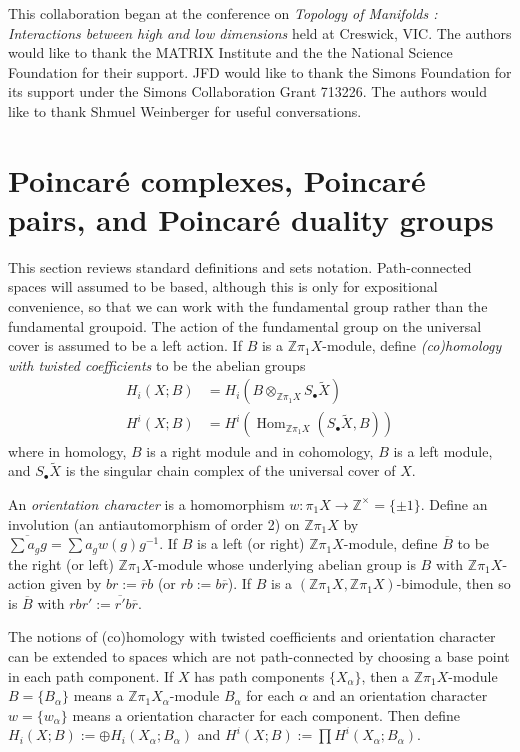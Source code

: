 \documentclass[12pt]{amsart}
\theoremstyle{definition}
\newcommand{\Z}{\mathbb Z}
\DeclareMathOperator{\Hom}{Hom}
\newcommand{\ol}[1]{{\overline{#1}}}
\newcommand{\wt}[1]{{\widetilde{#1}}}
\newcommand{\px}{\pi_1X}
\newcommand{\zpx}{\Z\pi_1X}
\begin{document}
\medskip
{}
This collaboration began at the conference on
 {\it Topology of Manifolds : Interactions between high and low dimensions\/} 
 held at Creswick, VIC.
The authors would like to thank the 
 MATRIX Institute and the  the National Science Foundation for their support.  
 JFD would like to thank the Simons Foundation for its support under  the Simons Collaboration Grant 713226.  The authors would like to thank Shmuel Weinberger for useful conversations.



\section{Poincar\'e complexes, Poincar\'e pairs, and Poincar\'e duality groups} \label{definitions}

This section  reviews standard definitions and sets notation.   Path-connected spaces will assumed to be based, although this is only for expositional convenience, so that we can work with the fundamental group rather than the fundamental groupoid.   The action of the fundamental group on the universal cover is assumed to be a left action.   
  If $B$ is a  $\Z\pi_1X$-module, define {\em (co)homology with twisted coefficients} to be the abelian groups 
\begin{align*}
H_i(X;B) &= H_i(B \otimes_{\zpx} S_\bullet \wt X)  \\
H^i(X;B) &= H^i(\Hom_{\zpx}(S_\bullet \wt X, B))
\end{align*}
where in homology, $B$ is a right module and in cohomology, $B$ is a left module, and $S_\bullet \wt X$ is the singular chain complex of the universal cover of $X$.

An {\em orientation character} is a homomorphism $w: \px \to \Z^{\times} = \{\pm 1 \}$.  Define an involution (an antiautomorphism of order 2) on $\Z\pi_1X$ by $\ol{\sum a_g g} = \sum a_g w(g) g^{-1}$. If $B$ is a left (or right) $\zpx$-module, define $\ol B$ to be the right (or left) $\zpx$-module whose underlying abelian group  is $B$ with $\zpx$-action given by $br:= \ol r b  $ (or $rb:= b \ol r$).  If $B$ is a $(\Z\pi_1X,\Z\pi_1X)$-bimodule, then so is $\ol B$ with $rbr' :=  \ol {r'} b \ol r$.



The notions of (co)homology with twisted coefficients and orientation character can be extended to spaces which are not path-connected by choosing a base point in each path component.    If $X$ has path components $\{X_\alpha\}$, then a $\zpx$-module $B = \{B_\alpha\}$ means a $\zpx_\alpha$-module $B_\alpha$ for each $\alpha$ and an orientation character $w = \{w_\alpha\}$ means a orientation character for each component.   Then define $H_i(X;B) := \oplus H_i(X_\alpha; B_\alpha)$ and $H^i(X;B) := \prod H^i(X_\alpha; B_\alpha)$.
\end{document}
